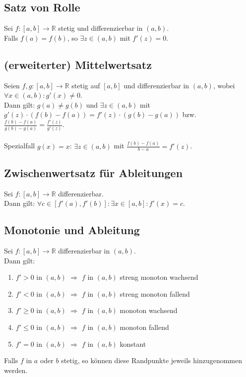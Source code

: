 \documentclass[halfparscip]{scrartcl}
\newcounter{subsection2}
\begin{document}
\subsection{Satz von Rolle}
Sei $f :[a,b] \rightarrow \mathbb{R}$ stetig und differenzierbar in $(a,b)$.\\
Falls $f(a) = f(b)$, so $\exists z \in (a,b)$ mit $f'(z) = 0$.

\subsection{(erweiterter) Mittelwertsatz}
Seien $f,g : [a,b] \rightarrow \mathbb{R}$ stetig auf $[a,b]$ und differenzierbar in $(a,b)$, wobei $\forall x \in (a,b) : g'(x) \neq 0$.\\
Dann gilt: $g(a) \neq g(b)$ und $\exists z \in (a,b)$ mit $g'(z)\cdot\left(f(b) - f(a)\right) = f'(z)\cdot\left(g(b)-g(a)\right)$ bzw. $\frac{f(b)-f(a)}{g(b)-g(a)} = \frac{f'(z)}{g'(z)}$.\\\\
Spezialfall $g(x) = x$: $\exists z \in (a,b)$ mit $\frac{f(b)-f(a)}{b-a}=f'(z)$.

\subsection*{Zwischenwertsatz für Ableitungen}
Sei $f : [a,b] \rightarrow \mathbb{R}$ differenzierbar.\\
Dann gilt: $\forall c \in [f'(a),f'(b)] : \exists x \in [a,b] : f'(x) = c$. 
\subsection{Monotonie und Ableitung}
Sei $f : [a,b] \rightarrow \mathbb{R}$ differenzierbar in $(a,b)$.\\
Dann gilt:
\begin{enumerate}
	\item $f'>0$ in $(a,b)$ $\Rightarrow$ $f$ in $(a,b)$ streng monoton wachsend
	\item $f'<0$ in $(a,b)$ $\Rightarrow$ $f$ in $(a,b)$ streng monoton fallend	
	\item $f'\geq0$ in $(a,b)$ $\Rightarrow$ $f$ in $(a,b)$ monoton wachsend
	\item $f'\leq0$ in $(a,b)$ $\Rightarrow$ $f$ in $(a,b)$ monoton fallend
	\item $f' = 0$ in $(a,b)$ $\Rightarrow$ $f$ in $(a,b)$ konstant
\end{enumerate}
Falls $f$ in $a$ oder $b$ stetig, so können diese Randpunkte jeweils hinzugenommen werden.\\
\end{document}
